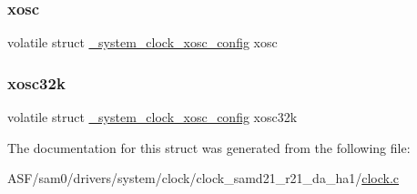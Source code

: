 \subsubsection{\texorpdfstring{xosc}{xosc}}
{\footnotesize\ttfamily volatile struct \mbox{\hyperlink{struct__system__clock__xosc__config}{\+\_\+system\+\_\+clock\+\_\+xosc\+\_\+config}} xosc}

\mbox{\label{struct__system__clock__module_afc9c7a25cb5d055b1c8edf01d0e30a9e}} 
\subsubsection{\texorpdfstring{xosc32k}{xosc32k}}
{\footnotesize\ttfamily volatile struct \mbox{\hyperlink{struct__system__clock__xosc__config}{\+\_\+system\+\_\+clock\+\_\+xosc\+\_\+config}} xosc32k}



The documentation for this struct was generated from the following file\+:\begin{DoxyCompactItemize}
\item 
A\+S\+F/sam0/drivers/system/clock/clock\+\_\+samd21\+\_\+r21\+\_\+da\+\_\+ha1/\mbox{\hyperlink{clock_8c}{clock.\+c}}\end{DoxyCompactItemize}
